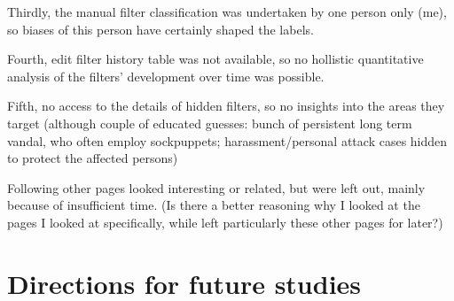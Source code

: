 Thirdly, the manual filter classification was undertaken by one person only (me), so biases of this person have certainly shaped the labels.

Fourth, edit filter history table was not available, so no hollistic quantitative analysis of the filters' development over time was possible.

Fifth, no access to the details of hidden filters, so no insights into the areas they target (although couple of educated guesses: bunch of persistent long term vandal, who often employ sockpuppets; harassment/personal attack cases hidden to protect the affected persons)

Following other pages looked interesting or related, but were left out, mainly because of insufficient time.
(Is there a better reasoning why I looked at the pages I looked at specifically, while left particularly these other pages for later?)

\begin{comment}
Question:
Oftentimes edit filter managers are also bot operators; how would they decide when to implement a filter and when a bot?
I've compiled a list of edit filter managers who are simultaneously also bot operators;
I've further assembled the bots they run and made notes on the bots that seem to be relevant to vandalism prevention/quality assurance
I'm currently trying to determine from document traces what filter contributions the corresponding edit filter managers had and whether they are working on filters similar to the bots they operate.
Insight is currently minimal, since abuse\_filter\_history table is not available and we can only determine what filters an edit filter manager has worked on from limited traces such as: last modifier of the filter from abuse\_filter table; editors who signed their comments from abuse\_filter table; probably some noticeboards or talk page archives, but I haven't looked into these so far.
\end{comment}


\section{Directions for future studies}
\label{sec:further-studies}

